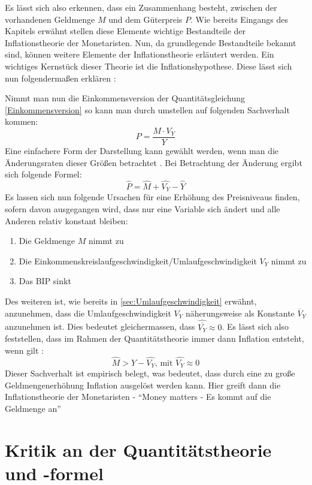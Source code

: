 Es lässt sich also erkennen, dass ein Zusammenhang besteht, zwischen der vorhandenen Geldmenge $M$ und dem Güterpreis $P$. Wie bereits Eingangs des Kapitels erwähnt stellen diese Elemente wichtige Bestandteile der Inflationstheorie der Monetaristen. Nun, da grundlegende Bestandteile bekannt sind, können weitere Elemente der Inflationstheorie erläutert werden. Ein wichtiges Kernstück dieser Theorie ist die Inflationshypothese. Diese lässt sich nun folgendermaßen erklären \autocite{defMon}:

Nimmt man nun die Einkommensversion der Quantitätsgleichung \vref{Einkommensversion} so kann man durch umstellen auf folgenden Sachverhalt kommen:
\[
    P = \frac{M \cdot V_Y}{Y}    
\]
Eine einfachere Form der Darstellung kann gewählt werden, wenn man die Änderungsraten dieser Größen betrachtet \autocite[111]{clement1998grundlagen}. Bei Betrachtung der Änderung ergibt sich folgende Formel:
$$ \widehat{P} = \widehat{M} + \widehat{V_Y} - \widehat{Y} $$
Es lassen sich nun folgende Ursachen für eine Erhöhung des Preisniveaus finden, sofern davon ausgegangen wird, dass nur eine Variable sich ändert und alle Anderen relativ konstant bleiben:

\begin{enumerate}
    \item Die Geldmenge $M$ nimmt zu
    \item Die Einkommenskreislaufgeschwindigkeit/Umlaufgeschwindigkeit $V_Y$ nimmt zu
    \item Das BIP sinkt
\end{enumerate}

Des weiteren ist, wie bereits in \vref{sec:Umlaufgeschwindigkeit} erwähnt, anzunehmen, dass die Umlaufgeschwindigkeit $V_Y$ näherungsweise als Konstante $\overline{V}_Y$ anzunehmen ist. Dies bedeutet gleichermassen, dass $\widehat{\overline{V_Y}} \approx 0$. Es lässt sich also feststellen, dass im Rahmen der Quantitätstheorie immer dann Inflation entsteht, wenn gilt \autocite[16--17]{historyQunatitaetstheorie}:
    \[
        \widehat{M} > \widehat{Y} - \widehat{V_Y} \text{, mit } \widehat{V_Y} \approx 0
    \]\label{Inflationshyptothese}
Dieser Sachverhalt ist empirisch belegt, was bedeutet, dass durch eine zu große Geldmengenerhöhung Inflation ausgelöst werden kann. Hier greift dann die Inflationstheorie der Monetaristen - \enquote{Money matters - Es kommt auf die Geldmenge an}

\section{Kritik an der Quantitätstheorie und -formel}

